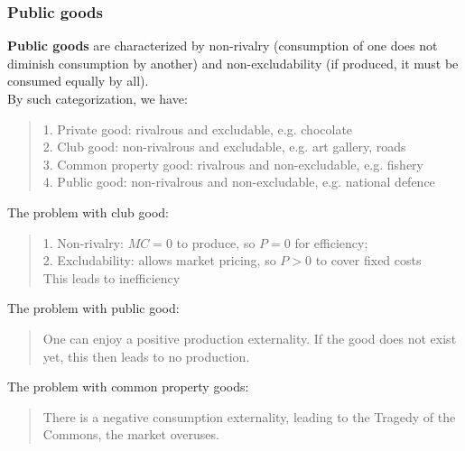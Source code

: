 \subsubsection{Public goods}
\textbf{Public goods} are characterized by non-rivalry (consumption of one does not diminish consumption by another) and non-excludability (if produced, it must be consumed equally by all). \\
By such categorization, we have:
\begin{quote}
    1. Private good: rivalrous and excludable, e.g. chocolate \\
    2. Club good: non-rivalrous and excludable, e.g. art gallery, roads \\
    3. Common property good: rivalrous and non-excludable, e.g. fishery \\
    4. Public good: non-rivalrous and non-excludable, e.g. national defence
\end{quote}
The problem with club good:
\begin{quote}
    1. Non-rivalry: $MC = 0$ to produce, so $P = 0$ for efficiency; \\
    2. Excludability: allows market pricing, so $P > 0$ to cover fixed costs \\
    This leads to inefficiency
\end{quote}
The problem with public good:
\begin{quote}
    One can enjoy a positive production externality. If the good does not exist yet, this then leads to no production.
\end{quote}
The problem with common property goods:
\begin{quote}
    There is a negative consumption externality, leading to the Tragedy of the Commons, the market overuses.
\end{quote}
